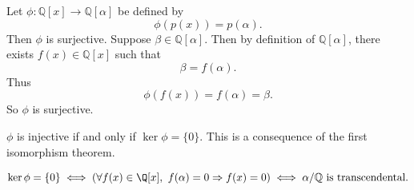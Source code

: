 \begin{proposition}{
    Let $\phi:\mathbb{Q}[x]\to \mathbb{Q}[\alpha]$ be defined by
    \[
        \phi(p(x))=p(\alpha).
    \]
    Then $\phi$ is surjective.
}
    Suppose $\beta\in\mathbb{Q}[\alpha]$.
    Then by definition of $\mathbb{Q}[\alpha]$, there exists $f(x)\in\mathbb{Q}[x]$ such that
    \[
        \beta=f(\alpha).
    \]
    Thus
    \[
        \phi(f(x))=f(\alpha)=\beta.
    \]
    So $\phi$ is surjective.
\end{proposition}

$\phi$ is injective if and only if $\ker\phi=\{0\}$.
This is a consequence of the first isomorphism theorem.

\begin{proposition*}{
    \[
        \ker\phi=\{0\}
        \iff
        (\forall f(x)\in\Q[x],\ f(\alpha)=0 \Rightarrow f(x)=0)
        \iff
        \alpha/\mathbb{Q}\text{ is transcendental.}
    \]
}
\end{proposition*}